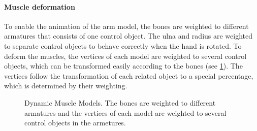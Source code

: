 \paragraph{Muscle deformation} To enable the animation of the arm model, the bones are weighted to different armatures that consists of one control object. 
The ulna and radius are weighted to separate control objects to behave correctly when the hand is rotated. 
To deform the muscles, the vertices of each model are weighted to several control objects, which can be transformed easily according to the bones (see \figurename{\ref{fig:3-IMR:modelArmature}}). 
The vertices follow the transformation of each related object to a special percentage, which is determined by their weighting. 
\begin{figure}[htb]
	\centering
	\caption{Dynamic Muscle Models. The bones are weighted to different armatures and the vertices of each model are weighted to several control objects in the armetures.}
	\label{fig:3-IMR:modelArmature}
\end{figure}
